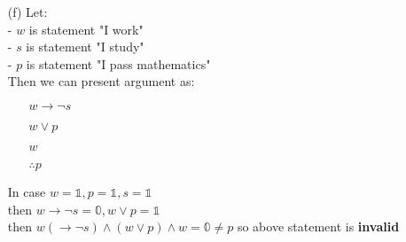\begin{enumerate}
    \item[(f)] Let: \\
        - $w$ is statement "I work" \\
        - $s$ is statement "I study" \\
        - $p$ is statement "I pass mathematics" \\
        Then we can present argument as:
        \begin{enumerate}
            \item[] $w \rightarrow \neg s$
            \item[] $w \lor p$
            \item[] $w$
            \item[] $\therefore p$
        \end{enumerate}
        In case $w=\mathbb{1}, p=\mathbb{1}, s=\mathbb{1}$ \\
        then $w\rightarrow \neg s = \mathbb{0}, w\lor p = \mathbb{1}$ \\
        then $w(\rightarrow \neg s) \land (w\lor p) \land w = \mathbb{0} \neq p$ so above statement is \textbf{invalid}
\end{enumerate}

